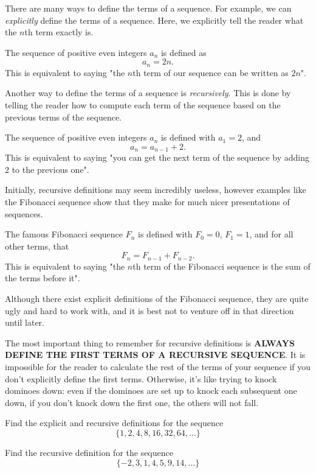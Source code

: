 There are many ways to define the terms of a sequence. For example, we can \emph{explicitly} define the terms of a sequence. Here, we explicitly tell the reader what the $n$th term exactly is.
\begin{example}
    The sequence of positive even integers $a_n$ is defined as
    \[a_n=2n.\]
    This is equivalent to saying "the $n$th term of our sequence can be written as $2n$".
\end{example}
Another way to define the terms of a sequence is \emph{recursively}. This is done by telling the reader how to compute each term of the sequence based on the previous terms of the sequence.
\begin{example}
    The sequence of positive even integers $a_n$ is defined with $a_1=2$, and
    \[a_n=a_{n-1}+2.\]
    This is equivalent to saying "you can get the next term of the sequence by adding $2$ to the previous one".
\end{example}
Initially, recursive definitions may seem incredibly useless, however examples like the Fibonacci sequence show that they make for much nicer presentations of sequences.
\begin{example}
    The famous Fibonacci sequence $F_n$ is defined with $F_0=0$, $F_1=1$, and for all other terms, that
    \[F_n=F_{n-1}+F_{n-2}.\]
    This is equivalent to saying "the $n$th term of the Fibonacci sequence is the sum of the terms before it". 
\end{example}
\begin{remark}
    Although there exist explicit definitions of the Fibonacci sequence, they are quite ugly and hard to work with, and it is best not to venture off in that direction until later. 
\end{remark}
The most important thing to remember for recursive definitions is \textbf{ALWAYS DEFINE THE FIRST TERMS OF A RECURSIVE SEQUENCE}. It is impossible for the reader to calculate the rest of the terms of your sequence if you don't explicitly define the first terms. Otherwise, it's like trying to knock dominoes down: even if the dominoes are set up to knock each subsequent one down, if you don't knock down the first one, the others will not fall.
\begin{exercise}
    Find the explicit and recursive definitions for the sequence 
    \[\{1, 2, 4, 8, 16, 32, 64,\dots\}\]
\end{exercise}
\begin{exercise}
    Find the recursive definition for the sequence
    \[\{-2, 3, 1, 4, 5, 9, 14,\dots\}\]
\end{exercise}

